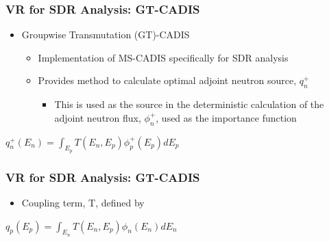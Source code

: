 \documentclass{beamer}
\begin{document}
\begin{frame}
\frametitle{VR for SDR Analysis: GT-CADIS}
\begin{itemize}
\item{Groupwise Transmutation (GT)-CADIS}
  \begin{itemize}
  \item{Implementation of MS-CADIS specifically for SDR analysis}
  \item{Provides method to calculate optimal adjoint neutron source, $q_n^+$}
    \begin{itemize}
    \item{This is used as the source in the deterministic calculation of the    adjoint neutron flux, $\phi_{n}^{+}$, used as the importance function}
    
    \end{itemize}
  \end{itemize}
\end{itemize}
\centering
{$q_n^+(E_n)=\int_{E_p} T(E_n, E_p) \phi_p^+(E_p) dE_p$}
\end{frame}


\begin{frame}
\frametitle{VR for SDR Analysis: GT-CADIS}
\begin{itemize}
\item{Coupling term, T, defined by}
\end{itemize}

\centering
{$q_p(E_p) = \int_{E_n} T(E_n, E_p) \phi_n(E_n) dE_n$}


\end{frame}
\end{document}
